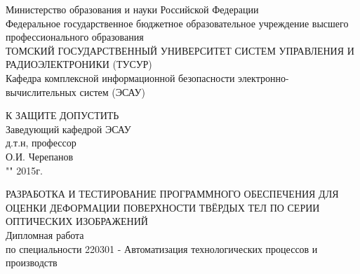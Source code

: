 \newpage
{}

\begin{center}
Министерство образования и науки Российской Федерации\\
Федеральное государственное бюджетное образовательное учреждение высшего профессионального образования\\
ТОМСКИЙ ГОСУДАРСТВЕННЫЙ УНИВЕРСИТЕТ СИСТЕМ УПРАВЛЕНИЯ И РАДИОЭЛЕКТРОНИКИ (ТУСУР)\\
Кафедра комплексной информационной безопасности электронно-вычислительных систем (ЭСАУ)\\
\end{center}

\hfill
\begin{minipage}[right]{0.4\linewidth}
\begin{singlespace}
 К ЗАЩИТЕ ДОПУСТИТЬ \\
 Заведующий кафедрой ЭСАУ \\
 д.т.н, профессор \\
 \underline{\hspace{2.5cm}}О.И. Черепанов \\
 "\underline{\hspace{1cm}}"\underline{\hspace{3cm}} 2015г.\\
\end{singlespace} 
\end{minipage}


\begin{center}
РАЗРАБОТКА И ТЕСТИРОВАНИЕ ПРОГРАММНОГО ОБЕСПЕЧЕНИЯ ДЛЯ ОЦЕНКИ ДЕФОРМАЦИИ ПОВЕРХНОСТИ ТВЁРДЫХ ТЕЛ ПО СЕРИИ ОПТИЧЕСКИХ ИЗОБРАЖЕНИЙ \\
Дипломная работа \\
по специальности 220301 - Автоматизация технологических процессов и производств\\
\vspace{1.5cm}
\end{center}


